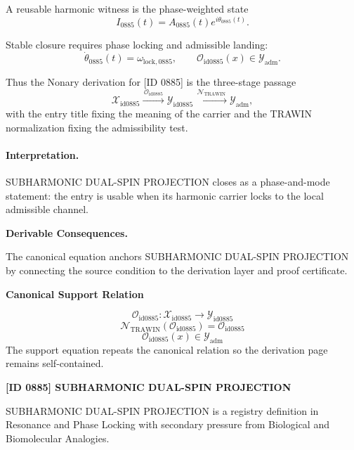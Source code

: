 A reusable harmonic witness is the phase-weighted state\[
I_{0885}(t)=A_{0885}(t)e^{i\theta_{0885}(t)}.
\]

Stable closure requires phase locking and admissible landing:\[
\dot{\theta}_{0885}(t)=\omega_{\mathrm{lock},0885},\qquad \mathcal{O}_{\mathrm{id0885}}(x)\in\mathcal{Y}_{\mathrm{adm}}.
\]

Thus the Nonary derivation for [ID 0885] is the three-stage passage
\[
\mathcal{X}_{\mathrm{id0885}}\xrightarrow{\,\mathcal{O}_{\mathrm{id0885}}\,} \mathcal{Y}_{\mathrm{id0885}}\xrightarrow{\,\mathcal{N}_{\mathrm{TRAWIN}}\,} \mathcal{Y}_{\mathrm{adm}},
\]
with the entry title fixing the meaning of the carrier and the TRAWIN normalization fixing the admissibility test.

\paragraph{Interpretation.} SUBHARMONIC DUAL-SPIN PROJECTION closes as a phase-and-mode statement: the entry is usable when its harmonic carrier locks to the local admissible channel.

\par\vspace{0.35em}
\noindent\textbf{Derivable Consequences.}\quad
\begingroup
\footnotesize
\raggedright
The canonical equation anchors SUBHARMONIC DUAL-SPIN PROJECTION by connecting the source condition to the derivation layer and proof certificate.
\par\endgroup

\noindent\textbf{Canonical Support Relation}\par
\[
\mathcal{O}_{\mathrm{id0885}}:\mathcal{X}_{\mathrm{id0885}}\longrightarrow\mathcal{Y}_{\mathrm{id0885}}
\]
\[
\mathcal{N}_{\mathrm{TRAWIN}}(\mathcal{O}_{\mathrm{id0885}})=\mathcal{O}_{\mathrm{id0885}}
\]
\[
\mathcal{O}_{\mathrm{id0885}}(x)\in\mathcal{Y}_{\mathrm{adm}}
\]
\noindent The support equation repeats the canonical relation so the derivation page remains self-contained.\par

\clearpage
\noindent\textbf{[ID 0885] SUBHARMONIC DUAL-SPIN PROJECTION}\par
\vspace{0.35em}
\begingroup\small
{}
SUBHARMONIC DUAL-SPIN PROJECTION is a registry definition in Resonance and Phase Locking with secondary pressure from Biological and Biomolecular Analogies.

